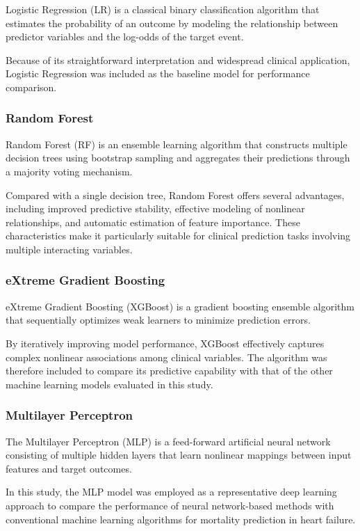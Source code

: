 \documentclass[12pt]{article}
\begin{document}
Logistic Regression (LR) is a classical binary classification algorithm that estimates the probability of an outcome by modeling the relationship between predictor variables and the log-odds of the target event.

Because of its straightforward interpretation and widespread clinical application, Logistic Regression was included as the baseline model for performance comparison. 

\subsubsection{Random Forest}

Random Forest (RF) is an ensemble learning algorithm that constructs multiple decision trees using bootstrap sampling and aggregates their predictions through a majority voting mechanism.

Compared with a single decision tree, Random Forest offers several advantages, including improved predictive stability, effective modeling of nonlinear relationships, and automatic estimation of feature importance. These characteristics make it particularly suitable for clinical prediction tasks involving multiple interacting variables. 

\subsubsection{eXtreme Gradient Boosting}

eXtreme Gradient Boosting (XGBoost) is a gradient boosting ensemble algorithm that sequentially optimizes weak learners to minimize prediction errors.

By iteratively improving model performance, XGBoost effectively captures complex nonlinear associations among clinical variables. The algorithm was therefore included to compare its predictive capability with that of the other machine learning models evaluated in this study. 

\subsubsection{Multilayer Perceptron}

The Multilayer Perceptron (MLP) is a feed-forward artificial neural network consisting of multiple hidden layers that learn nonlinear mappings between input features and target outcomes.

In this study, the MLP model was employed as a representative deep learning approach to compare the performance of neural network-based methods with conventional machine learning algorithms for mortality prediction in heart failure. 
\end{document}
